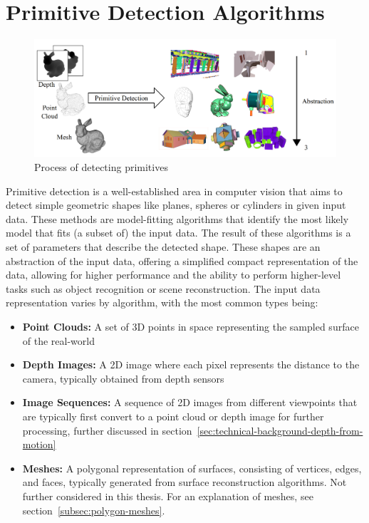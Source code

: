 \chapter{Primitive Detection Algorithms}\label{ch:primitive-detection-algorithms}

\begin{figure}[ht!]
    \centering
    \includegraphics[width=\linewidth]{images/primitive_detection}
    \caption{Process of detecting primitives \cite{kaiser_survey_2019}}
    \label{fig:primitive_detection}
\end{figure}
Primitive detection is a well-established area in computer vision that aims to detect simple geometric shapes
like planes, spheres or cylinders in given input data.
These methods are model-fitting algorithms that identify the most likely model that fits (a subset of) the input data.
The result of these algorithms is a set of parameters that describe the detected shape.
These shapes are an abstraction of the input data, offering a simplified compact representation of the data,
allowing for higher performance and the ability to perform higher-level tasks such as object recognition or scene reconstruction.
The input data representation varies by algorithm, with the most common types being:
\begin{itemize}
    \item \textbf{Point Clouds:} A set of 3D points in space representing the sampled surface of the real-world
    \item \textbf{Depth Images:} A 2D image where each pixel represents the distance to the camera, typically obtained from depth sensors
    \item \textbf{Image Sequences:} A sequence of 2D images from different viewpoints that are typically first convert to a point cloud or depth image for further processing, further discussed in section~\ref{sec:technical-background-depth-from-motion}
    \item \textbf{Meshes:} A polygonal representation of surfaces, consisting of vertices, edges, and faces, typically generated from surface reconstruction algorithms.
    Not further considered in this thesis.
    For an explanation of meshes, see section~\ref{subsec:polygon-meshes}.~\cite{kaiser_survey_2019}
\end{itemize}

